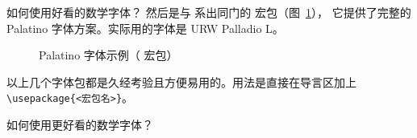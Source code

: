 \begin{myQA}{如何使用好看的数学字体？}
	然后是与  系出同门的 
	 宏包（图~\ref{Fig:pxfonts}），
	它提供了完整的 Palatino 字体方案。实际用的字体是 URW Palladio L。
	
	\begin{figure}[h]
		\centering
		\caption{Palatino 字体示例（ 宏包）}
		\label{Fig:pxfonts}
	\end{figure}
	
	以上几个字体包都是久经考验且方便易用的。用法是直接在导言区加上 \verb|\usepackage{<宏包名>}|。
\end{myQA}

\begin{myQA}{如何使用更好看的数学字体？}
\end{myQA}